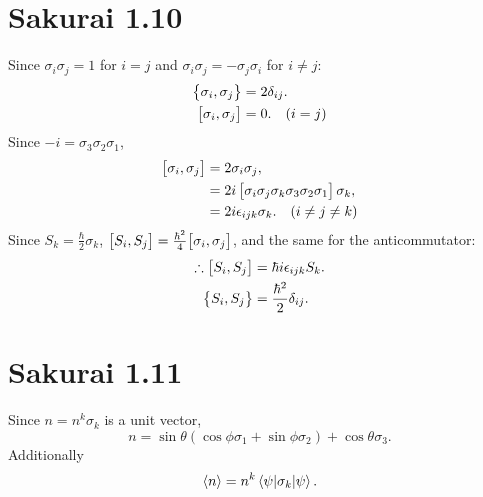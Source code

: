 \documentclass[
a4paper,
10pt,
twoside,
]{article}
\begin{document}
\section{Sakurai 1.10}
Since $\sigma_i\sigma_j = 1$ for $i=j$ and $\sigma_i\sigma_j = -\sigma_j\sigma_i$ for $i\neq j$:
\begin{align}
	\anticommutator{\sigma_i}{\sigma_j} &= 2\delta_{ij}.\\
	\commutator{\sigma_i}{\sigma_j} &= 0.\quad(i=j)\\
\end{align}
Since $-i=\sigma_3\sigma_2\sigma_1$,
\begin{align}
	\commutator{\sigma_i}{\sigma_j} &= 2\sigma_i\sigma_j,\\
	&= 2i \left[\sigma_i\sigma_j\sigma_k \sigma_3\sigma_2\sigma_1\right] \sigma_k,\\
	&= 2i \epsilon_{ijk} \sigma_k.\quad(i\neq j \neq k) 
\end{align}
Since $S_k = \frac{\hbar}{2}\sigma_k$, $\commutator{S_i}{S_j} = \frac{\hbar^2}{4}\commutator{\sigma_i}{\sigma_j}$, and the same for the anticommutator:
\begin{align}
	\therefore \commutator{S_i}{S_j} &= \hbar i \epsilon_{ijk} S_k.\\
	\anticommutator{S_i}{S_j} &= \frac{\hbar^2}{2} \delta_{ij}.
\end{align}

\section{Sakurai 1.11}
Since $n = n^k \sigma_k$ is a unit vector,
\begin{equation}
	n = \sin\theta(\cos\phi \sigma_1 + \sin\phi \sigma_2) + \cos\theta \sigma_3.
\end{equation}
Additionally
\begin{equation}
	\ev{n} = n^k \ev{\sigma_k}{\psi}.
\end{equation}

\printbib


\stopmcols
\end{document}
